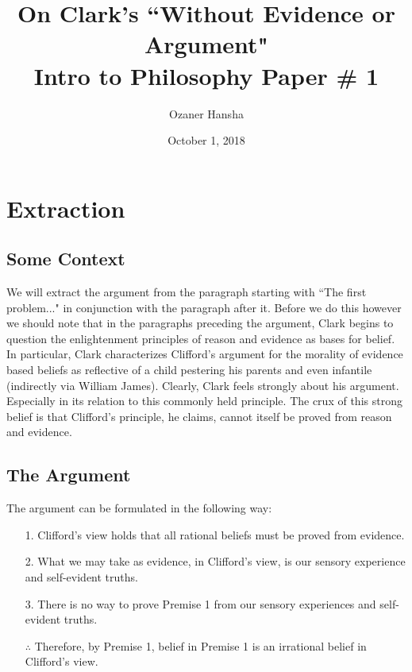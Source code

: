 \documentclass{article}
\begin{document}
\title{%
  On Clark's ``Without Evidence or Argument" \\
  \large Intro to Philosophy Paper \# 1}
\author{Ozaner Hansha}
\date{October 1, 2018}
\maketitle


\section{Extraction}
\subsection{Some Context}
We will extract the argument from the paragraph starting with ``The first problem..." in conjunction with the paragraph after it. Before we do this however we should note that in the paragraphs preceding the argument, Clark begins to question the enlightenment principles of reason and evidence as bases for belief. In particular, Clark characterizes Clifford's argument for the morality of evidence based beliefs as reflective of a child pestering his parents and even infantile (indirectly via William James). Clearly, Clark feels strongly about his argument. Especially in its relation to this commonly held principle. The crux of this strong belief is that Clifford's principle, he claims, cannot itself be proved from reason and evidence.

\subsection{The Argument}
The argument can be formulated in the following way:

\begin{itemize}
    \item[1.] Clifford's view holds that all rational beliefs must be proved from evidence.
    \item[2.] What we may take as evidence, in Clifford's view, is our sensory experience and self-evident truths.
    \item[3.] There is no way to prove Premise 1 from our sensory experiences and self-evident truths.
    \item[$\therefore$] Therefore, by Premise 1, belief in Premise 1 is an irrational belief in Clifford's view.
\end{itemize}
\end{document}
